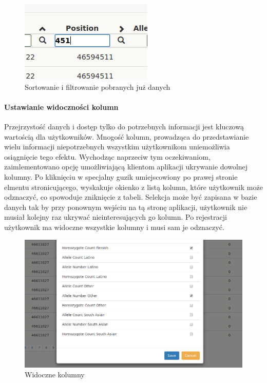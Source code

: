 \documentclass[a4paper,12pt,twoside]{article}
\begin{document}
\begin{figure}[h]
\centering
\includegraphics{obrazy/aplikacja/sortingAndSearch.png}
\caption{Sortowanie i filtrowanie pobranych już danych}
\label{fig:sortingAndSearchpic}
\end{figure}

\newpage
\paragraph{Ustawianie widoczności kolumn}
Przejrzystość danych i dostęp tylko do potrzebnych informacji jest kluczową wartością dla użytkowników.
Mnogość kolumn, prowadząca do przedstawianie wielu informacji niepotrzebnych
wszystkim użytkownikom uniemożliwia osiągnięcie tego efektu. Wychodząc naprzeciw tym oczekiwaniom,
zaimlementowano opcję umożliwiającą klientom aplikacji ukrywanie dowolnej kolumny.
Po kliknięciu w specjalny guzik umiejscowiony po prawej stronie elmentu stronicującego, wyskakuje okienko z listą kolumn,
które użytkownik może odznaczyć, co spowoduje zniknięcie z tabeli. Selekcja może być zapisana
w bazie danych tak by przy ponownym wejściu na tą stronę aplikacji, użytkownik nie musiał
kolejny raz ukrywać nieinteresujących go kolumn. Po rejestracji użytkownik ma widoczne wszystkie
kolumny i musi sam je odznaczyć.

\begin{figure}[h]
\includegraphics[width=\linewidth]{obrazy/aplikacja/visible_columns.png}
\caption{Widoczne kolumny}
\label{fig:visible_columnspic}
\end{figure}
\end{document}

